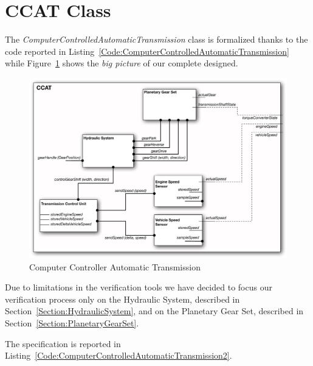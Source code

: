 \section{CCAT Class}
\label{Section:ComputerControlledAutomaticTransmission}
The \emph{ComputerControlledAutomaticTransmission} class is formalized thanks to the code reported in Listing~\ref{Code:ComputerControlledAutomaticTransmission} while Figure~\ref{Figure:CCAT} shows the \emph{big picture} of our complete designed.



\thispagestyle{empty}
\begin{figure}[!p]
\vspace{-3 cm}
\centerline{\includegraphics[scale=0.8,angle=-90]{images/CCAT.pdf}}
\caption{Computer Controller Automatic Transmission}
\label{Figure:CCAT}
\end{figure}

\newpage
Due to limitations in the verification tools we have decided to focus our verification process only on the Hydraulic System, described in Section~\ref{Section:HydraulicSystem}, and on the Planetary Gear Set, described in Section~\ref{Section:PlanetaryGearSet}.

The specification is reported in Listing~\ref{Code:ComputerControlledAutomaticTransmission2}.


